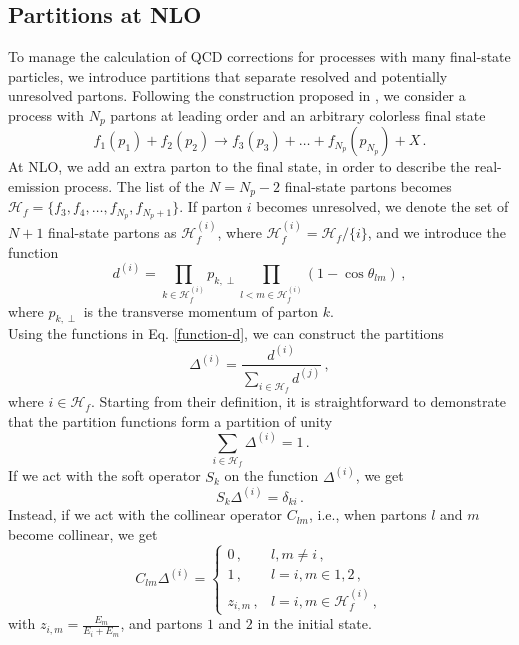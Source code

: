 \documentclass[a4paper, 12pt]{book}
\begin{document}
\begin{appendices}
\section{Partitions at NLO}
\label{partition-damping}
To manage the calculation of QCD corrections for processes with many final-state particles, we introduce partitions that separate resolved and potentially unresolved partons. Following the construction proposed in \cite{Devoto:2023rpv}, we consider a process with $N_p$ partons at leading order and an arbitrary colorless final state
\begin{equation}
  f_1(p_1)+f_2(p_2) \to f_3(p_3) + \dots + f_{N_p}(p_{N_p})+X \, .
\end{equation}
At NLO, we add an extra parton to the final state, in order to describe the real-emission process. The list of the $N=N_p-2$ final-state partons becomes $\mathcal{H}_{f}=\{f_3,f_4, \dots, f_{N_p},f_{N_p+1}\}$. If parton $i$ becomes unresolved, we denote the set of $N+1$ final-state partons as $\mathcal{H}^{(i)}_f$, where $\mathcal{H}^{(i)}_f= \mathcal{H}_{f} \slash \{i\}$, and we introduce the function
\begin{equation}
  d^{(i)}= \prod_{k \in \mathcal{H}_{f}^{(i)}} p_{k,\perp} \prod_{l < m \in \mathcal{H}_f^{(i)}} (1 - \cos{\theta_{lm}}) \, ,
  \label{function-d}
\end{equation}
where $p_{k,\perp}$ is the transverse momentum of parton $k$. \\
Using the functions in Eq. \ref{function-d}, we can construct the partitions
\begin{equation}
  \Delta^{(i)}= \frac{d^{(i)}}{\sum_{i\in \mathcal{H}_f}d^{(j)}}  \, ,
  \label{delta-partition}
\end{equation}
where $i \in \mathcal{H}_f$. Starting from their definition, it is straightforward to demonstrate that the partition functions form a partition of unity
\begin{equation}
  \sum_{i \in \mathcal{H}_f} \Delta^{(i)}=1 \, .
\end{equation}
If we act with the soft operator $S_k$ on the function $\Delta^{(i)}$, we get
\begin{equation}
  S_k \Delta^{(i)} = \delta_{ki} \, .
\end{equation}
Instead, if we act with the collinear operator $C_{lm}$, i.e., when partons $l$ and $m$ become collinear, we get
\begin{equation}
  C_{lm}\Delta^{(i)}=  \begin{cases}
    0 \, , & l,m \neq i \,, \\
    1 \,, & l=i, m \in{1,2} \,, \\
    z_{i,m}\, ,& l=i, m \in \mathcal{H}_f^{(i)} \,,
  \end{cases}
\end{equation}
with $z_{i,m}= \frac{E_m}{E_i+E_m}$, and partons $1$ and $2$ in the initial state. \\


\end{appendices}
\end{document}
